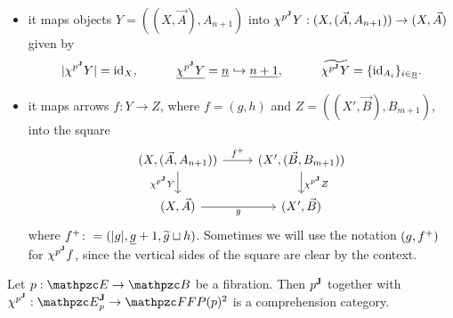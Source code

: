 \documentclass{lmcs} %
\theoremstyle{plain}\newtheorem{satz}[thm]{Satz} %
\begin{document}
\begin{itemize}
	\item it maps objects $Y=((X,\vec{A}),A_{n+1})$ into $\chi^{{p}^{\mathbf{J}}} Y:(X,(\vec{A}, A_{n+1}))\rightarrow(X,\vec{A})$ given by 
	\[
	|\chi^{{p}^{\mathbf{J}}} Y|=\mathrm{id}_{X},
	\hspace{7ex}
	\underline{\chi^{{p}^{\mathbf{J}}} Y}=\underline{n}\hookrightarrow \underline{n+1},
	\hspace{7ex}
	\widetilde{\chi^{{p}^{\mathbf{J}}} Y}=\{\mathrm{id}_{A_i}\}_{i\in \underline{n}}.
	\]
	
	\item it maps arrows $f:Y\rightarrow Z$, where $f=(g,h)$ and $Z=((X',\vec{B}), B_{m+1})$, into the square 
	\[\begin{tikzcd}
		{(X,(\vec{A}, A_{n+1}))} & {(X',(\vec{B}, B_{m+1}))} \\
		{(X,\vec{A})} & {(X',\vec{B})}
		\arrow["\carr{f}", from=1-1, to=1-2]
		\arrow["\JFC{p} Y"', from=1-1, to=2-1]
		\arrow["\JFC{p} Z", from=1-2, to=2-2]
		\arrow["g"', from=2-1, to=2-2]
	\end{tikzcd}\]
	where $f^+\colon=(|g|,\underline{g}+1,\widetilde{g}\sqcup h)$. Sometimes we will use the notation $(g,f^+)$ for $\chi^{{p}^{\mathbf{J}}}f$, since the vertical sides of the square are clear by the context.
	
\end{itemize}

			\begin{prop}
				Let $p:\ct{E}\to\ct{B}$ be a fibration. Then ${p}^{\mathbf{J}}$ together with $\JFC{p}:\JDomE{p}\to \Arr{\FFFP{p}}$ is a comprehension category. 
			\end{prop}
			
\end{document}
